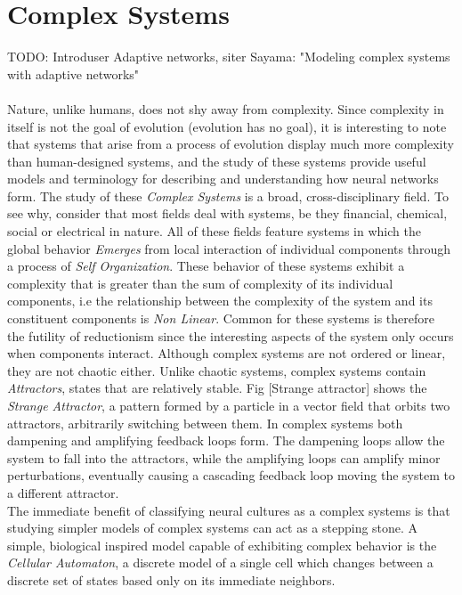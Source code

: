 \section{Complex Systems}
TODO: Introduser Adaptive networks, siter Sayama: "Modeling complex systems with
adaptive networks"\\ \\
%
Nature, unlike humans, does not shy away from complexity.
Since complexity in itself is not the goal of evolution (evolution has no goal), 
it is interesting to note that systems that arise from a process of evolution
display much more complexity than human-designed systems, and the study of these
systems provide useful models and terminology for describing and understanding
how neural networks form.
%
The study of these \emph{Complex Systems} is a broad, cross-disciplinary field.
To see why, consider that most fields deal with systems, be they financial,
chemical, social or electrical in nature.
All of these fields feature systems in which the global behavior \emph{Emerges}
from local interaction of individual components through a process of \emph{Self
  Organization}.
These behavior of these systems exhibit a complexity that is greater than the
sum of complexity of its individual components, i.e the relationship between the
complexity of the system and its constituent components is \emph{Non Linear}.
Common for these systems is therefore the futility of reductionism since the
interesting aspects of the system only occurs when components interact.
Although complex systems are not ordered or linear, they are not chaotic either.
%
Unlike chaotic systems, complex systems contain \emph{Attractors}, states that
are relatively stable.
Fig [Strange attractor] shows the \emph{Strange Attractor}, a pattern formed by
a particle in a vector field that orbits two attractors, arbitrarily switching
between them.
In complex systems both dampening and amplifying feedback loops form.
The dampening loops allow the system to fall into the attractors, while the
amplifying loops can amplify minor perturbations, eventually causing a cascading
feedback loop moving the system to a different attractor.\\
%
The immediate benefit of classifying neural cultures as a complex systems is
that studying simpler models of complex systems can act as a stepping stone.
A simple, biological inspired model capable of exhibiting complex behavior is
the \emph{Cellular Automaton}, a discrete model of a single cell which changes
between a discrete set of states based only on its immediate neighbors.
